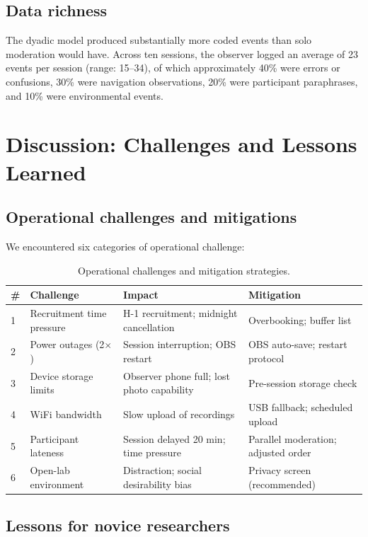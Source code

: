 \documentclass[conference]{IEEEtran}
\begin{document}
\subsection{Data richness}

The dyadic model produced substantially more coded events than solo moderation would have. Across ten
sessions, the observer logged an average of 23 events per session (range: 15--34), of which
approximately 40\% were errors or confusions, 30\% were navigation observations, 20\% were participant
paraphrases, and 10\% were environmental events.

\section{Discussion: Challenges and Lessons Learned}
\label{sec:discussion}

\subsection{Operational challenges and mitigations}

We encountered six categories of operational challenge:

\begin{table}[h]
\caption{Operational challenges and mitigation strategies.}
\label{tab:challenges}
\centering
\begin{tabular}{@{}llll@{}}
\toprule
\# & Challenge & Impact & Mitigation \\
\midrule
1 & Recruitment time pressure & H-1 recruitment; midnight cancellation & Overbooking; buffer list \\
2 & Power outages (2$\times$) & Session interruption; OBS restart & OBS auto-save; restart protocol \\
3 & Device storage limits & Observer phone full; lost photo capability & Pre-session storage check \\
4 & WiFi bandwidth & Slow upload of recordings & USB fallback; scheduled upload \\
5 & Participant lateness & Session delayed 20 min; time pressure & Parallel moderation; adjusted order \\
6 & Open-lab environment & Distraction; social desirability bias & Privacy screen (recommended) \\
\bottomrule
\end{tabular}
\end{table}

\subsection{Lessons for novice researchers}
\end{document}
